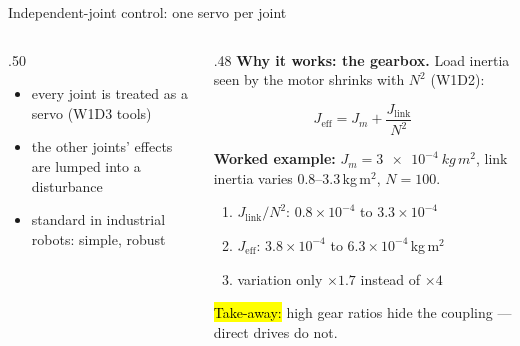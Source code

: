 \documentclass[aspectratio=169,10pt]{beamer}
\newcommand{\sumsym}{\scalebox{.7}{$\Sigma$}}
\begin{document}
\begin{frame}{Independent-joint control: one servo per joint}
\begin{columns}[T]
\begin{column}{.50\textwidth}
\centering
{}

\vspace{2mm}
\small
\begin{itemize}\setlength\itemsep{.4mm}
\item every joint is treated as a  servo (W1D3 tools)
\item the other joints' effects are lumped into a disturbance
\item standard in industrial robots: simple, robust
\end{itemize}
\end{column}
\begin{column}{.48\textwidth}
\small
\textbf{Why it works: the gearbox.} Load inertia seen by the motor shrinks with $N^2$ (W1D2):
\begin{eqbox}
\[ J_{\text{eff}}=J_m+\frac{J_{\text{link}}}{N^2} \]
\end{eqbox}
\textbf{Worked example:} $J_m=\SI{3e-4}{kg\,m^2}$, link inertia varies 0.8--3.3\,kg\,m$^2$, $N=100$.
\begin{enumerate}\setlength\itemsep{.3mm}
\item $J_{\text{link}}/N^2$: $0.8\times10^{-4}$ to $3.3\times10^{-4}$
\item $J_{\text{eff}}$: $3.8\times10^{-4}$ to $6.3\times10^{-4}$\,kg\,m$^2$
\item variation only $\times1.7$ instead of $\times4$ \checkmark
\end{enumerate}
\hl{Take-away:} high gear ratios hide the coupling --- direct drives do not.
\end{column}
\end{columns}
\end{frame}
\end{document}
